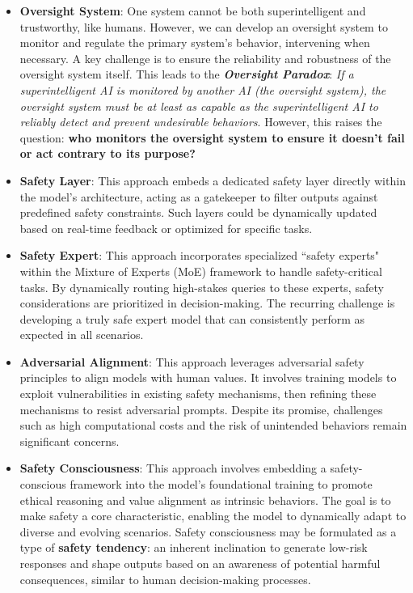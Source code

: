 \begin{itemize}
    \item \textbf{Oversight System}: One system cannot be both superintelligent and trustworthy, like humans. However, we can develop an oversight system to monitor and regulate the primary system’s behavior, intervening when necessary. A key challenge is to ensure the reliability and robustness of the oversight system itself. This leads to the \textbf{\textit{Oversight Paradox}}: \textit{If a superintelligent AI is monitored by another AI (the oversight system), the oversight system must be at least as capable as the superintelligent AI to reliably detect and prevent undesirable behaviors}. However, this raises the question: \textbf{who monitors the oversight system to ensure it doesn't fail or act contrary to its purpose?}

    \item \textbf{Safety Layer}: This approach embeds a dedicated safety layer \cite{zhao2024defending, li2024safelayer} directly within the model’s architecture, acting as a gatekeeper to filter outputs against predefined safety constraints. Such layers could be dynamically updated based on real-time feedback or optimized for specific tasks.

    \item \textbf{Safety Expert}: This approach incorporates specialized ``safety experts" within the Mixture of Experts (MoE) framework \cite{jacobs1991adaptive, shazeer2017outrageously, fedus2022switch, jiang2024mixtral} to handle safety-critical tasks. By dynamically routing high-stakes queries to these experts, safety considerations are prioritized in decision-making. The recurring challenge is developing a truly safe expert model that can consistently perform as expected in all scenarios.
    
    \item \textbf{Adversarial Alignment}: This approach leverages adversarial safety principles to align models with human values. It involves training models to exploit vulnerabilities in existing safety mechanisms, then refining these mechanisms to resist adversarial prompts. Despite its promise, challenges such as high computational costs and the risk of unintended behaviors remain significant concerns.
    
    \item \textbf{Safety Consciousness}: This approach involves embedding a safety-conscious framework into the model’s foundational training to promote ethical reasoning and value alignment as intrinsic behaviors. The goal is to make safety a core characteristic, enabling the model to dynamically adapt to diverse and evolving scenarios. Safety consciousness may be formulated as a type of \textbf{safety tendency}: an inherent inclination to generate low-risk responses and shape outputs based on an awareness of potential harmful consequences, similar to human decision-making processes.
    
\end{itemize}


